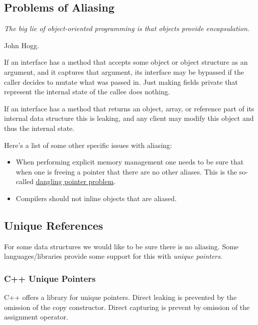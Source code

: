 \documentclass{article}
\begin{document}
\subsection{Problems of Aliasing}

\epigraph{\itshape The big lie of object-oriented programming is that objects provide encapsulation.}{John Hogg.}

\begin{remark}\label{captures}
If an interface has a method that accepts some object or object structure as an argument, and it captures that argument, its interface may be bypassed if the caller decides to mutate what was passed in.
Just making fields private that represent the internal state of the callee does nothing.
\end{remark}

\begin{remark}\label{leaks}
If an interface has a method that returns an object, array, or reference part of its internal data structure this is leaking, and any client may modify this object and thus the internal state.
\end{remark}

Here's a list of some other specific issues with aliasing:
\begin{itemize}
\item When performing explicit memory management one needs to be sure that when one is freeing a pointer that there are no other aliases. This is the so-called \href{https://en.wikipedia.org/wiki/Dangling_pointer}{dangling pointer problem}.
\item Compilers should not inline objects that are aliased.
\end{itemize}

\subsection{Unique References}

For some data structures we would like to be sure there is no aliasing.
Some languages/libraries provide some support for this with \textit{unique pointers}.

\subsubsection{C++ Unique Pointers}

C++ offers a library for unique pointers.
Direct leaking is prevented by the omission of the copy constructor.
Direct capturing is prevent by omission of the assignment operator.
\end{document}
